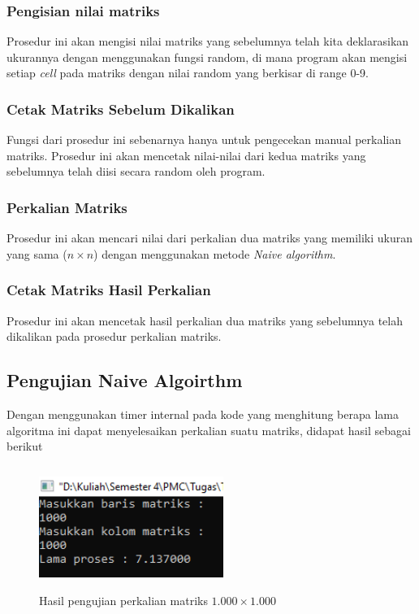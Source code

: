 \documentclass[conference]{IEEEtran}
\begin{document}
\subsubsection{Pengisian nilai matriks}
Prosedur ini akan mengisi nilai matriks yang sebelumnya telah kita deklarasikan ukurannya dengan menggunakan fungsi random, 
di mana program akan mengisi setiap \textit{cell} pada matriks dengan nilai random yang berkisar di range 0-9.
\subsubsection{Cetak Matriks Sebelum Dikalikan}
Fungsi dari prosedur ini sebenarnya hanya untuk pengecekan manual perkalian matriks. 
Prosedur ini akan mencetak nilai-nilai dari kedua matriks yang sebelumnya telah diisi secara random oleh program.
\subsubsection{Perkalian Matriks}
Prosedur ini akan mencari nilai dari perkalian dua matriks yang memiliki ukuran yang sama ($n\times n$) dengan menggunakan metode \textit{Naive algorithm}.
\subsubsection{Cetak Matriks Hasil Perkalian}
Prosedur ini akan mencetak hasil perkalian dua matriks yang sebelumnya telah dikalikan pada prosedur perkalian matriks.

\subsection{Pengujian Naive Algoirthm}
Dengan menggunakan timer internal pada kode yang menghitung berapa lama algoritma ini dapat menyelesaikan perkalian suatu matriks, 
didapat hasil sebagai berikut

\begin{figure}[h]
   \includegraphics[width = 6cm, height = 4cm]{Uji_Naive Algorithm_1k.png}
   \centering
   \caption{Hasil pengujian perkalian matriks $1.000\times1.000$}
\end{figure}
\end{document}
